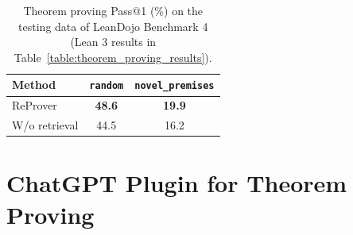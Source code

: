 \documentclass{article}
\newcommand\name{ReProver}
\begin{document}



\begin{table}[ht]
  \centering
  \caption{Theorem proving Pass@1 (\%) on the testing data of LeanDojo Benchmark 4 (Lean 3 results in  Table~\ref{table:theorem_proving_results}).}
  \begin{tabular}{@{}lcc@{}}
    \toprule
     Method & \texttt{random} & \texttt{novel\_premises} \\
    \midrule
    {\name} & \textbf{48.6} & \textbf{19.9} \\
    W/o retrieval & 44.5 & 16.2 \\
    \bottomrule
  \end{tabular}
  \label{table:lean4_theorem_proving_results}
\end{table}



\section{ChatGPT Plugin for Theorem Proving}
\label{appendix:chatgpt}
\end{document}
